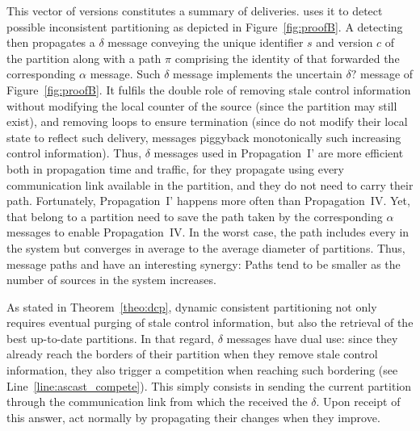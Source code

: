 This vector of versions constitutes a summary of deliveries. \NAME
uses it to detect possible inconsistent partitioning as depicted in
Figure~\ref{fig:proofB}. A detecting \process then propagates a
$\delta$ message conveying the unique identifier $s$ and version $c$
of the partition along with a path $\pi$ comprising the identity of
\processes that forwarded the corresponding $\alpha$ message. Such
$\delta$ message implements the uncertain $\delta?$ message of
Figure~\ref{fig:proofB}. It fulfils the double role of removing stale
control information without modifying the local counter of the source
(since the partition may still exist), and removing loops to ensure
termination (since \processes do not modify their local state to
reflect such delivery, messages piggyback monotonically such
increasing control information). Thus, $\delta$ messages used in
Propagation~I' are more efficient both in propagation time and
traffic, for they propagate using every communication link available
in the partition, and they do not need to carry their path.
Fortunately, Propagation~I' happens more often than Propagation~IV.
Yet, \processes that belong to a partition need to save the path taken
by the corresponding $\alpha$ messages to enable Propagation~IV.  In
the worst case, the path includes every \processes in the system but
converges in average to the average diameter of partitions. Thus,
message paths and \NAME have an interesting synergy: Paths tend to be
smaller as the number of sources in the system increases.

As stated in Theorem~\ref{theo:dcp}, dynamic consistent partitioning
not only requires eventual purging of stale control information, but
also the retrieval of the best up-to-date partitions. In that regard,
$\delta$ messages have dual use: since they already reach the borders
of their partition when they remove stale control information, they
also trigger a competition when reaching such bordering \processes
(see Line~\ref{line:ascast_compete}). This simply consists in sending
the current partition through the communication link from which the
\process received the $\delta$. Upon receipt of this answer,
\processes act normally by propagating their changes when they
improve.

